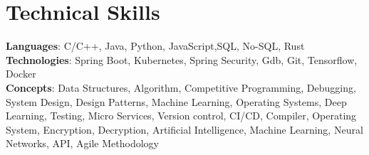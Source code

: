\section{Technical Skills}
    \begin{itemize}[leftmargin=0.15in, label={}]
	\small{\item{
		\textbf{Languages}{: C/C++, Java, Python, JavaScript,SQL, No-SQL, Rust} \\
		\textbf{Technologies}{: Spring Boot, Kubernetes, Spring Security, Gdb, Git, Tensorflow, Docker } \\
		\textbf{Concepts}{: Data Structures, Algorithm, Competitive Programming, Debugging, System Design, Design Patterns, Machine Learning, Operating Systems, Deep Learning, Testing, Micro Services, Version control, CI/CD, Compiler, Operating System, Encryption, Decryption, Artificial Intelligence, Machine Learning, Neural Networks, API, Agile Methodology}
	}}
    \end{itemize}